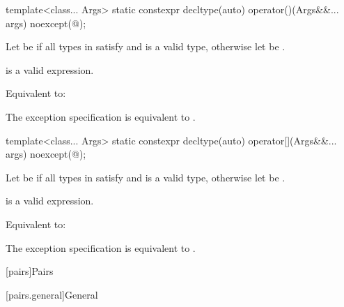 %
\begin{itemdecl}
template<class... Args>
  static constexpr decltype(auto) operator()(Args&&... args) noexcept(@\seebelow@);
\end{itemdecl}

\begin{itemdescr}
\pnum
Let  be
if all types in  satisfy  and
 is a valid type,
otherwise let  be .

\pnum
\constraints
{} is a valid expression.

\pnum
\effects
Equivalent to: 

\pnum
\remarks
The exception specification is equivalent to .
\end{itemdescr}

%
\begin{itemdecl}
template<class... Args>
  static constexpr decltype(auto) operator[](Args&&... args) noexcept(@\seebelow@);
\end{itemdecl}

\begin{itemdescr}
\pnum
Let  be
if all types in  satisfy  and
 is a valid type,
otherwise let  be .

\pnum
\constraints
{} is a valid expression.

\pnum
\effects
Equivalent to: 

\pnum
\remarks
The exception specification is equivalent to .
\end{itemdescr}

[pairs]{Pairs}

[pairs.general]{General}

